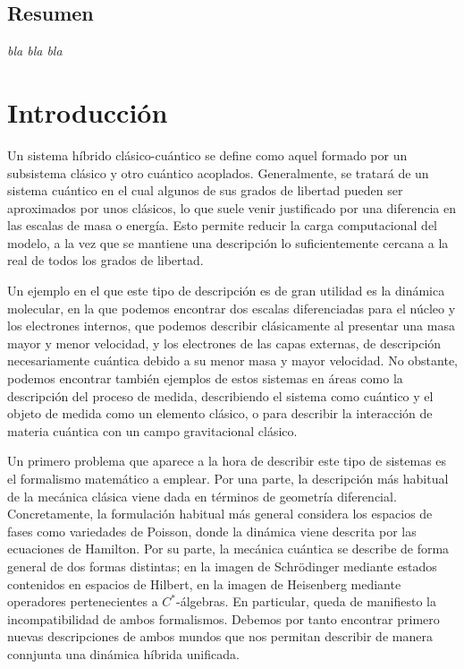 \documentclass[openany, 11pt]{book}
\title{}
\author{Nicolás Díez Andrés}
\date{Curso 2025/2026}
\numberwithin{equation}{chapter}
\begin{document}


\newpage 
\renewcommand{\chaptermark}[1]{\markboth{#1}{}}
\pagestyle{fancy}
\fancyfoot[C]{\thepage}

\section*{Resumen}

\newpage

\textit{bla bla bla}

\newpage

\tableofcontents

\newpage
{}

\chapter{Introducción}

Un sistema híbrido clásico-cuántico se define como aquel formado por un subsistema clásico y otro cuántico
acoplados. Generalmente, se tratará de un sistema cuántico en el cual algunos de sus grados de libertad
pueden ser aproximados por unos clásicos, lo que suele venir justificado por una diferencia en las escalas de masa
o energía. Esto permite reducir la carga computacional del modelo, a la vez que se mantiene una descripción lo suficientemente
cercana a la real de todos los grados de libertad. 

Un ejemplo en el que este tipo de descripción es de gran utilidad es la dinámica molecular,
en la que podemos encontrar dos escalas diferenciadas para el núcleo y los electrones internos, que podemos describir clásicamente al presentar 
una masa mayor y menor velocidad, y los electrones de las capas externas, de descripción necesariamente cuántica debido a su menor masa y mayor velocidad. 
No obstante, podemos encontrar también ejemplos de estos sistemas en áreas como la descripción del proceso de medida, describiendo el sistema como cuántico 
y el objeto de medida como un elemento clásico, o para describir la interacción de materia cuántica con un campo gravitacional clásico.

Un primero problema que aparece a la hora de describir este tipo de sistemas es el formalismo matemático a emplear. Por una parte, la descripción más habitual de 
la mecánica clásica viene dada en términos de geometría diferencial. Concretamente, la formulación habitual más general considera los espacios de fases como variedades de 
Poisson, donde la dinámica viene descrita por las ecuaciones de Hamilton. Por su parte, la mecánica cuántica se describe de forma general de dos formas distintas; en la imagen de 
Schrödinger mediante estados contenidos en espacios de Hilbert, en la imagen de Heisenberg mediante operadores pertenecientes a $C^*$-álgebras. En particular, queda de manifiesto la 
incompatibilidad de ambos formalismos. Debemos por tanto encontrar primero nuevas descripciones de ambos mundos que nos permitan describir de manera connjunta una dinámica híbrida unificada.
\end{document}
